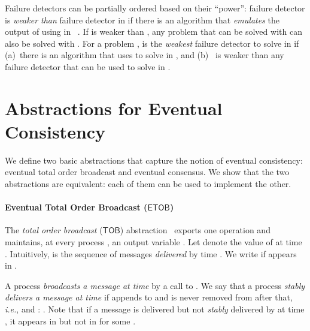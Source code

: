 \documentclass[11pt]{article}
\newcommand{\ETOB}{\ensuremath{\mathsf{ETOB}}}
\newcommand{\TOB}{\ensuremath{\mathsf{TOB}}}
\begin{document}
Failure detectors can be partially ordered based on their ``power'':
	failure detector  is \emph{weaker than}
	failure detector  in  if there is an algorithm
	that \emph{emulates} the output of  using  in ~\cite{CHT96,JT08}.
If  is weaker than , any problem that can be solved with
	 can also be solved with .
For a problem ,
	 is the \emph{weakest} failure detector to solve  in  if
	(a)~there is an algorithm that uses  to solve  in , and
	(b)~ is weaker than any failure detector  that can
be used to solve  in .




\section{Abstractions for Eventual Consistency}
\label{sec:defs}


We define two basic abstractions that capture the notion of eventual
consistency: eventual total order broadcast and eventual consensus.
We show that the two abstractions are equivalent: each of them can be
used to implement the other.

\paragraph{Eventual Total Order Broadcast (\ETOB)}
The \emph{total order broadcast} (\TOB) abstraction~\cite{HT94} exports one operation
 and
maintains, at every process , an output variable .
Let  denote the value of  at time .
Intuitively,  is the sequence of messages  \emph{delivered}
by time .
We write  if  appears in .

A process  \emph{broadcasts a message  at time
} by a call to .
We say that a process  \emph{stably delivers a message  at time }
if  appends  to  and  is never removed from  after
that, {\em i.e.},
 and : .
Note that if a message is delivered but not \emph{stably} delivered by  at time ,
it appears in  but not in  for some .
\end{document}
